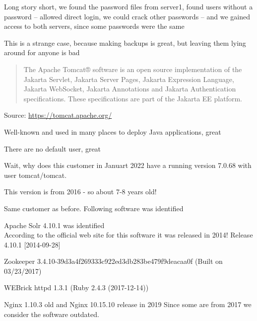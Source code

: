 \documentclass[Screen16to9,17pt]{foils}
\begin{document}
Long story short, we found the password files from server1, found users without a password -- allowed direct login, we could crack other passwords -- and we gained access to both servers, since some passwords were the same

This is a strange case, because making backups is great, but leaving them lying around for anyone is bad




\begin{quote}
The Apache Tomcat® software is an open source implementation of the Jakarta Servlet, Jakarta Server Pages, Jakarta Expression Language, Jakarta WebSocket, Jakarta Annotations and Jakarta Authentication specifications. These specifications are part of the Jakarta EE platform.
\end{quote}
Source: \url{https://tomcat.apache.org/}

\begin{list2}
\item Well-known and used in many places to deploy Java applications, great
\item There are no default user, great
\end{list2}

Wait, why does this customer in Januart 2022 have a running version 7.0.68 with user tomcat/tomcat.

This version is from 2016 - so about 7-8 years old!


Same customer as before. Following software was identified
\begin{list2}
\item Apache Solr 4.10.1 was identified\\
According to the official web site for this software it was released in 2014! Release 4.10.1 [2014-09-28]
\item Zookeeper 3.4.10-39d3a4f269333c922ed3db283be479f9deacaa0f (Built on 03/23/2017)
\item WEBrick httpd 1.3.1 (Ruby 2.4.3 (2017-12-14))
\item Nginx 1.10.3 old and Nginx 10.15.10 release in 2019
Since some are from 2017 we consider the software outdated.
\end{list2}



\end{document}

